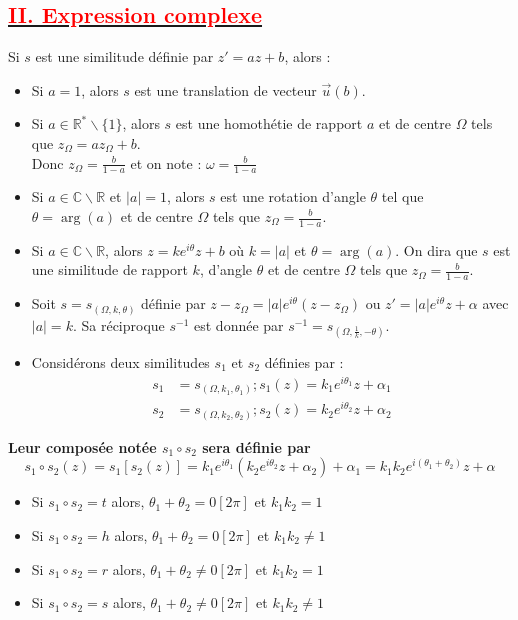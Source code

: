 \documentclass[12pt]{article}
\begin{document}
\subsection*{\underline{\textbf{\textcolor{red}{II. Expression complexe}}}}
Si $s$ est une similitude définie par $z' = az + b$, alors :
\begin{itemize}
    \item Si $a = 1$, alors $s$ est une translation de vecteur $\overrightarrow{u}(b)$.
    \item Si $a \in \mathbb{R}^* \backslash \{1\}$, alors $s$ est une homothétie de rapport $a$ et de centre $\Omega$ tels que $z_\Omega = az_\Omega + b$.\\
    Donc $z_\Omega = \frac{b}{1-a}$ et on note : $\omega = \frac{b}{1-a}$
    \item Si $a \in \mathbb{C} \backslash \mathbb{R}$ et $|a| = 1$, alors $s$ est une rotation d'angle $\theta$ tel que $\theta = \arg(a)$ et de centre $\Omega$ tels que $z_\Omega = \frac{b}{1-a}$.
    \item Si $a \in \mathbb{C} \backslash \mathbb{R}$, alors $z = ke^{i\theta}z + b$ où $k = |a|$ et $\theta = \arg(a)$. On dira que $s$ est une similitude de rapport $k$, d'angle $\theta$ et de centre $\Omega$ tels que $z_\Omega = \frac{b}{1-a}$.\\
    \item Soit $s = s_{(\Omega,k,\theta)}$ définie par $z - z_\Omega = |a|e^{i\theta} (z - z_\Omega)$ ou $z' = |a|e^{i\theta} z + \alpha$ avec $|a|=k$.
  Sa réciproque $s^{-1}$ est donnée par $s^{-1} = s_{(\Omega, \frac{1}{k} ,- \theta)}$.\\ 
    \item Considérons deux similitudes $s_1$ et $s_2$ définies par :
    \begin{align*}
        s_1 &= s_{(\Omega,k_1 ,\theta_1)} ; s_{1}(z)= k_1 e^{i\theta_1} z + \alpha_1 \\
        s_2 &= s_{(\Omega,k_2 ,\theta_2)} ; s_{2}(z)= k_2 e^{i\theta_2} z + \alpha_2
    \end{align*}
\end{itemize}
\textbf{Leur composée notée $s_1 \circ s_2$ sera définie par}
\[ s_1 \circ s_2(z)=s_1[s_2(z)]= k_1 e^{i\theta_1} (k_2 e^{i\theta_2} z + \alpha_2) + \alpha_1 = k_1 k_2 e^{i(\theta_1 + \theta_2)}z + \alpha \]

\begin{itemize}
    \item Si $s_1 \circ s_2 = t$ alors, $\theta_1 + \theta_2 = 0[2\pi]$ et $k_1 k_2 = 1$
    \item Si $s_1 \circ s_2 = h$ alors, $\theta_1 + \theta_2 = 0[2\pi]$ et $k_1 k_2 \neq 1$ 
    \item Si $s_1 \circ s_2 = r$ alors, $\theta_1 + \theta_2 \neq 0[2\pi]$ et $k_1 k_2 = 1$
    \item Si $s_1 \circ s_2 = s$ alors, $\theta_1 + \theta_2 \neq 0[2\pi]$ et $k_1 k_2 \neq 1$
\end{itemize}
\end{document}
